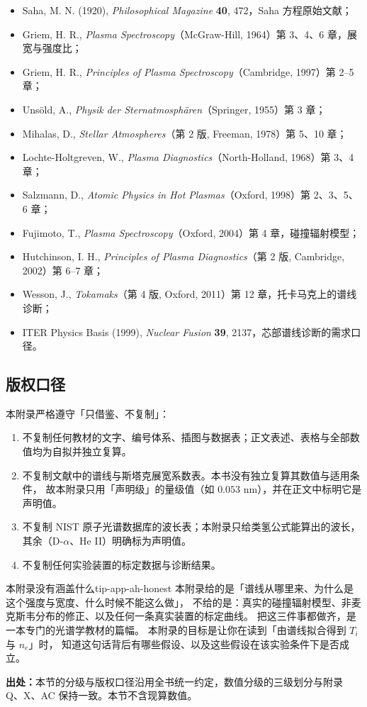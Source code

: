 \begin{itemize}
\item Saha, M. N. (1920), \emph{Philosophical Magazine} \textbf{40}, 472，Saha 方程原始文献；
\item Griem, H. R., \emph{Plasma Spectroscopy}（McGraw-Hill, 1964）第 3、4、6 章，展宽与强度比；
\item Griem, H. R., \emph{Principles of Plasma Spectroscopy}（Cambridge, 1997）第 2--5 章；
\item Unsöld, A., \emph{Physik der Sternatmosphären}（Springer, 1955）第 3 章；
\item Mihalas, D., \emph{Stellar Atmospheres}（第 2 版, Freeman, 1978）第 5、10 章；
\item Lochte-Holtgreven, W., \emph{Plasma Diagnostics}（North-Holland, 1968）第 3、4 章；
\item Salzmann, D., \emph{Atomic Physics in Hot Plasmas}（Oxford, 1998）第 2、3、5、6 章；
\item Fujimoto, T., \emph{Plasma Spectroscopy}（Oxford, 2004）第 4 章，碰撞辐射模型；
\item Hutchinson, I. H., \emph{Principles of Plasma Diagnostics}（第 2 版, Cambridge, 2002）第 6--7 章；
\item Wesson, J., \emph{Tokamaks}（第 4 版, Oxford, 2011）第 12 章，托卡马克上的谱线诊断；
\item ITER Physics Basis (1999), \emph{Nuclear Fusion} \textbf{39}, 2137，芯部谱线诊断的需求口径。
\end{itemize}

\subsection*{版权口径}

本附录严格遵守「只借鉴、不复制」：

\begin{enumerate}
\item 不复制任何教材的文字、编号体系、插图与数据表；正文表述、表格与全部数值均为自拟并独立复算。
\item 不复制文献中的谱线与斯塔克展宽系数表。本书没有独立复算其数值与适用条件，
故本附录只用「声明级」的量级值（如 $0.053$ nm），并在正文中标明它是声明值。
\item 不复制 NIST 原子光谱数据库的波长表；本附录只给类氢公式能算出的波长，
其余（D-$\alpha$、He II）明确标为声明值。
\item 不复制任何实验装置的标定数据与诊断结果。
\end{enumerate}

\begin{tip}{本附录没有涵盖什么}{tip-app-ah-honest}
本附录给的是「谱线从哪里来、为什么是这个强度与宽度、什么时候不能这么做」，
不给的是：真实的碰撞辐射模型、非麦克斯韦分布的修正、以及任何一条真实装置的标定曲线。
把这三件事都做齐，是一本专门的光谱学教材的篇幅。
本附录的目标是让你在读到「由谱线拟合得到 $T_i$ 与 $n_e$」时，
知道这句话背后有哪些假设、以及这些假设在该实验条件下是否成立。
\end{tip}

\textbf{出处：}本节的分级与版权口径沿用全书统一约定，数值分级的三级划分与附录 Q、X、AC 保持一致。本节不含现算数值。
\endgroup